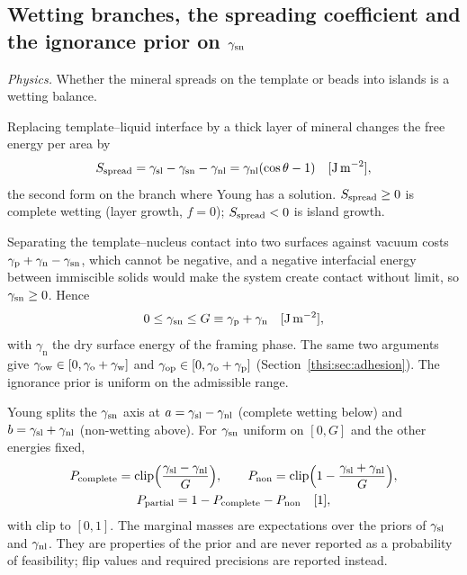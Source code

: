 \subsection{Wetting branches, the spreading coefficient and the ignorance prior on $\gamma_\mathrm{sn}$}\label{thsi:sec:branches}

\textit{Physics.} Whether the mineral spreads on the template or beads into islands is a wetting
balance.

Replacing template--liquid interface by a thick layer of mineral changes the free energy per area by
\begin{equation}\label{thsi:eq:spread}
S_\mathrm{spread}=\gamma_\mathrm{sl}-\gamma_\mathrm{sn}-\gamma_\mathrm{nl}=\gamma_\mathrm{nl}(\cos\theta-1) \quad[\mathrm{J\,m^{-2}}],
\end{equation}
the second form on the branch where Young has a solution. $S_\mathrm{spread}\ge0$ is complete wetting (layer growth,
$f=0$); $S_\mathrm{spread}<0$ is island growth.

Separating the template--nucleus contact into two surfaces against vacuum costs
$\gamma_\mathrm{p}+\gamma_\mathrm{n}-\gamma_\mathrm{sn}$, which cannot be negative, and a negative interfacial energy between
immiscible solids would make the system create contact without limit, so $\gamma_\mathrm{sn}\ge0$. Hence
\begin{equation}\label{thsi:eq:gsn-bounds}
0\le\gamma_\mathrm{sn}\le G\equiv\gamma_\mathrm{p}+\gamma_\mathrm{n} \quad[\mathrm{J\,m^{-2}}],
\end{equation}
with $\gamma_\mathrm{n}$ the dry surface energy of the framing phase. The same two arguments give
$\gamma_\mathrm{ow}\in[0,\gamma_\mathrm{o}+\gamma_\mathrm{w}]$ and $\gamma_\mathrm{op}\in[0,\gamma_\mathrm{o}+\gamma_\mathrm{p}]$ (Section~\ref{thsi:sec:adhesion}). The ignorance prior is
uniform on the admissible range. 

Young splits the $\gamma_\mathrm{sn}$ axis at $a=\gamma_\mathrm{sl}-\gamma_\mathrm{nl}$ (complete wetting below) and $b=\gamma_\mathrm{sl}+\gamma_\mathrm{nl}$ (non-wetting
above). For $\gamma_\mathrm{sn}$ uniform on $[0,G]$ and the other energies fixed,
\begin{equation}\label{thsi:eq:branches}
\begin{gathered}
P_\mathrm{complete}=\mathrm{clip}\Big(\frac{\gamma_\mathrm{sl}-\gamma_\mathrm{nl}}{G}\Big),\qquad
P_\mathrm{non}=\mathrm{clip}\Big(1-\frac{\gamma_\mathrm{sl}+\gamma_\mathrm{nl}}{G}\Big),\\
P_\mathrm{partial}=1-P_\mathrm{complete}-P_\mathrm{non} \quad[\mathrm{1}],
\end{gathered}
\end{equation}
with clip to $[0,1]$. The marginal masses are expectations over the priors of $\gamma_\mathrm{sl}$ and $\gamma_\mathrm{nl}$. They
are properties of the prior and are never reported as a probability of feasibility; flip values and
required precisions are reported instead.

